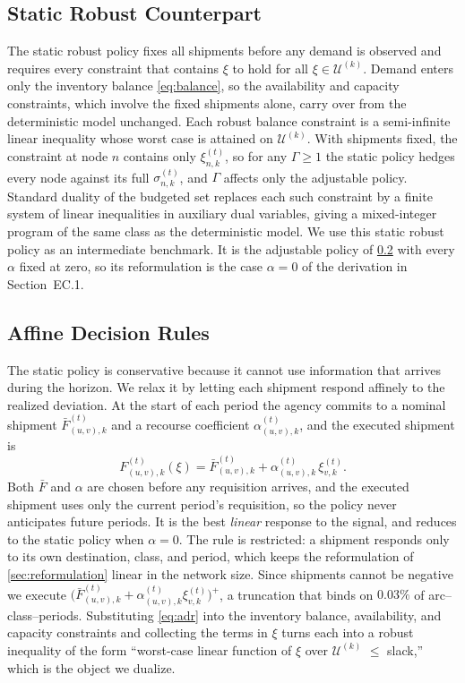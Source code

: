 \documentclass[11pt]{article}
\begin{document}
\subsection{Static Robust Counterpart}
\label{sec:static}

The static robust policy fixes all shipments before any demand is observed and requires every constraint that contains $\xi$ to hold for all $\xi \in \mathcal{U}^{(k)}$.
Demand enters only the inventory balance \eqref{eq:balance}, so the availability and capacity constraints, which involve the fixed shipments alone, carry over from the deterministic model unchanged.
Each robust balance constraint is a semi-infinite linear inequality whose worst case is attained on $\mathcal{U}^{(k)}$.
With shipments fixed, the constraint at node $n$ contains only $\xi_{n,k}^{(t)}$, so for any $\Gamma \ge 1$ the static policy hedges every node against its full $\sigma_{n,k}^{(t)}$, and $\Gamma$ affects only the adjustable policy.
Standard duality of the budgeted set \citep{bertsim04,bental} replaces each such constraint by a finite system of linear inequalities in auxiliary dual variables, giving a mixed-integer program of the same class as the deterministic model.
We use this static robust policy as an intermediate benchmark.
It is the adjustable policy of \Sec\ref{sec:adr} with every $\alpha$ fixed at zero, so its reformulation is the case $\alpha = 0$ of the derivation in Section~EC.1.

\subsection{Affine Decision Rules}
\label{sec:adr}

The static policy is conservative because it cannot use information that arrives during the horizon.
We relax it by letting each shipment respond affinely to the realized deviation.
At the start of each period the agency commits to a nominal shipment $\bar F_{(u,v),k}^{(t)}$ and a recourse coefficient $\alpha_{(u,v),k}^{(t)}$, and the executed shipment is
\begin{equation}
F_{(u,v),k}^{(t)}(\xi) = \bar F_{(u,v),k}^{(t)} + \alpha_{(u,v),k}^{(t)}\, \xi_{v,k}^{(t)}.
\label{eq:adr}
\end{equation}
Both $\bar F$ and $\alpha$ are chosen before any requisition arrives, and the executed shipment uses only the current period's requisition, so the policy never anticipates future periods.
It is the best \emph{linear} response to the signal, and reduces to the static policy when $\alpha = 0$.
The rule is restricted: a shipment responds only to its own destination, class, and period, which keeps the reformulation of \Sec\ref{sec:reformulation} linear in the network size.
Since shipments cannot be negative we execute $\big(\bar F_{(u,v),k}^{(t)} + \alpha_{(u,v),k}^{(t)}\xi_{v,k}^{(t)}\big)^{+}$, a truncation that binds on $0.03\%$ of arc--class--periods.
Substituting \eqref{eq:adr} into the inventory balance, availability, and capacity constraints and collecting the terms in $\xi$ turns each into a robust inequality of the form ``worst-case linear function of $\xi$ over $\mathcal{U}^{(k)}$ $\le$ slack,'' which is the object we dualize.
\end{document}
